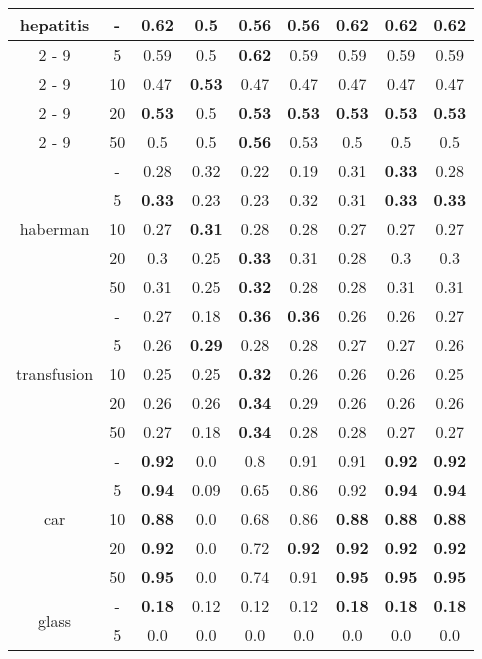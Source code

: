 \documentclass{article}%
\begin{document}
\begin{tabular}{c|c|ccccccc}
\hline%
\multirow{5}{*}{hepatitis}&{-}&\textbf{0.62}&0.5&0.56&0.56&\textbf{0.62}&\textbf{0.62}&\textbf{0.62}\\%
\cline{2%
-%
9}%
&5&0.59&0.5&\textbf{0.62}&0.59&0.59&0.59&0.59\\%
\cline{2%
-%
9}%
&10&0.47&\textbf{0.53}&0.47&0.47&0.47&0.47&0.47\\%
\cline{2%
-%
9}%
&20&\textbf{0.53}&0.5&\textbf{0.53}&\textbf{0.53}&\textbf{0.53}&\textbf{0.53}&\textbf{0.53}\\%
\cline{2%
-%
9}%
&50&0.5&0.5&\textbf{0.56}&0.53&0.5&0.5&0.5\\%
\hline%
\multirow{5}{*}{haberman}&{-}&0.28&0.32&0.22&0.19&0.31&\textbf{0.33}&0.28\\%
\cline{2%
-%
9}%
&5&\textbf{0.33}&0.23&0.23&0.32&0.31&\textbf{0.33}&\textbf{0.33}\\%
\cline{2%
-%
9}%
&10&0.27&\textbf{0.31}&0.28&0.28&0.27&0.27&0.27\\%
\cline{2%
-%
9}%
&20&0.3&0.25&\textbf{0.33}&0.31&0.28&0.3&0.3\\%
\cline{2%
-%
9}%
&50&0.31&0.25&\textbf{0.32}&0.28&0.28&0.31&0.31\\%
\hline%
\multirow{5}{*}{transfusion}&{-}&0.27&0.18&\textbf{0.36}&\textbf{0.36}&0.26&0.26&0.27\\%
\cline{2%
-%
9}%
&5&0.26&\textbf{0.29}&0.28&0.28&0.27&0.27&0.26\\%
\cline{2%
-%
9}%
&10&0.25&0.25&\textbf{0.32}&0.26&0.26&0.26&0.25\\%
\cline{2%
-%
9}%
&20&0.26&0.26&\textbf{0.34}&0.29&0.26&0.26&0.26\\%
\cline{2%
-%
9}%
&50&0.27&0.18&\textbf{0.34}&0.28&0.28&0.27&0.27\\%
\hline%
\multirow{5}{*}{car}&{-}&\textbf{0.92}&0.0&0.8&0.91&0.91&\textbf{0.92}&\textbf{0.92}\\%
\cline{2%
-%
9}%
&5&\textbf{0.94}&0.09&0.65&0.86&0.92&\textbf{0.94}&\textbf{0.94}\\%
\cline{2%
-%
9}%
&10&\textbf{0.88}&0.0&0.68&0.86&\textbf{0.88}&\textbf{0.88}&\textbf{0.88}\\%
\cline{2%
-%
9}%
&20&\textbf{0.92}&0.0&0.72&\textbf{0.92}&\textbf{0.92}&\textbf{0.92}&\textbf{0.92}\\%
\cline{2%
-%
9}%
&50&\textbf{0.95}&0.0&0.74&0.91&\textbf{0.95}&\textbf{0.95}&\textbf{0.95}\\%
\hline%
\multirow{5}{*}{glass}&{-}&\textbf{0.18}&0.12&0.12&0.12&\textbf{0.18}&\textbf{0.18}&\textbf{0.18}\\%
\cline{2%
-%
9}%
&5&0.0&0.0&0.0&0.0&0.0&0.0&0.0\\%

\end{tabular}
\end{document}

